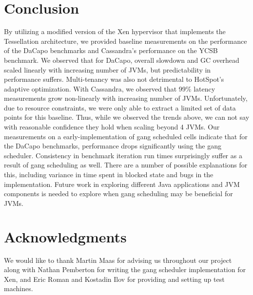 \documentclass{sig-alternate}
\begin{document}
\section{Conclusion} \label{sec:conclusion}
By utilizing a modified version of the Xen hypervisor that implements the Tessellation architecture, we provided baseline measurements on the performance of the DaCapo benchmarks and Cassandra's performance on the YCSB benchmark. We observed that for DaCapo, overall slowdown and GC overhead scaled linearly with increasing number of JVMs, but predictability in performance suffers. Multi-tenancy was also not detrimental to HotSpot's adaptive optimization. With Cassandra, we observed that 99\% latency measurements grow non-linearly with increasing number of JVMs. Unfortunately, due to  resource constraints, we were only able to extract a limited set of data points for this baseline. Thus, while we observed the trends above, we can not say with reasonable confidence they hold when scaling beyond 4 JVMs. Our measurements on a early-implementation of gang scheduled cells indicate that for the DaCapo benchmarks, performance drops significantly using the gang scheduler. Consistency in benchmark iteration run times surprisingly suffer as a result of gang scheduling as well. There are a number of possible explanations for this, including variance in time spent in blocked state and bugs in the implementation. Future work in exploring different Java applications and JVM components is needed to explore when gang scheduling may be beneficial for JVMs.


\section{Acknowledgments}
We would like to thank Martin Maas for advising us throughout our project along with Nathan Pemberton for writing the gang scheduler implementation for Xen, and Eric Roman and Kostadin Ilov for providing and setting up test machines.


%
%

\balancecolumns
\end{document}
